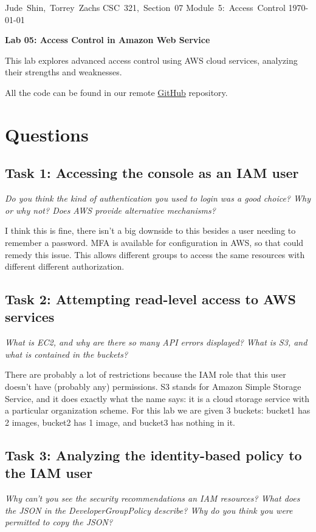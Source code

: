 \documentclass[11pt]{article}
\begin{document}
\hfill\vbox{\hbox{Jude Shin, Torrey Zachs}
		\hbox{CSC 321, Section 07}	
		\hbox{Module 5: Access Control}	
		\hbox{\today}}\par

\bigskip
\centerline{\Large\bf Lab 05: Access Control in Amazon Web Service}\par
\bigskip

This lab explores advanced access control using AWS cloud services, analyzing their strengths and weaknesses. 

All the code can be found in our remote \href{https://github.com/jude-shin/CSC\_321}{GitHub} repository.


\section*{Questions}
\subsection*{Task 1: Accessing the console as an IAM user}
\textit{Do you think the kind of authentication you used to login was a good choice? Why or why not? Does AWS provide alternative mechanisms?}

I think this is fine, there isn't a big downside to this besides a user needing to remember a password. MFA is available for configuration in AWS, so that could remedy this issue. This allows different groups to access the same resources with different different authorization.

\subsection*{Task 2: Attempting read-level access to AWS services}
\textit{What is EC2, and why are there so many API errors displayed? What is S3, and what is contained in the buckets?}

There are probably a lot of restrictions because the IAM role that this user doesn't have (probably any) permissions. S3 stands for Amazon Simple Storage Service, and it does exactly what the name says: it is a cloud storage service with a particular organization scheme. For this lab we are given 3 buckets: bucket1 has 2 images, bucket2 has 1 image, and bucket3 has nothing in it. 


\subsection*{Task 3: Analyzing the identity-based policy to the IAM user}
\textit{Why can't you see the security recommendations an IAM resources? What does the JSON in the DeveloperGroupPolicy describe? Why do you think you were permitted to copy the JSON?}
\end{document}
